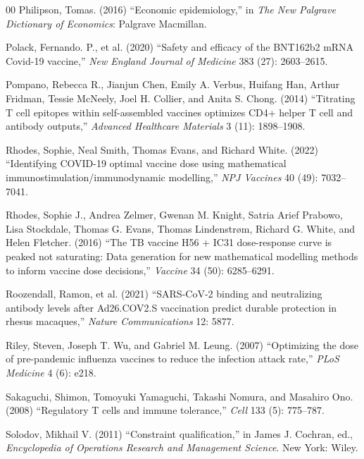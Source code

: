 \documentclass[12pt]{article}
\begin{document}
\begin{thebibliography}{00}
Philipson, Tomas. (2016) ``Economic epidemiology,'' in {\em The New
  Palgrave Dictionary of Economics}: Palgrave Macmillan.

Polack, Fernando. P., et al. (2020) ``Safety and efficacy of the
BNT162b2 mRNA Covid-19 vaccine,'' {\em New England Journal of
  Medicine} 383 (27): 2603--2615.

Pompano, Rebecca R., Jianjun Chen, Emily A. Verbus, Huifang Han,
Arthur Fridman, Tessie McNeely, Joel H. Collier, and Anita
S. Chong. (2014) ``Titrating T cell epitopes within self-assembled
vaccines optimizes CD4+ helper T cell and antibody outputs,'' {\em
  Advanced Healthcare Materials} 3 (11): 1898--1908.

Rhodes, Sophie, Neal Smith, Thomas Evans, and Richard White. (2022)
``Identifying COVID-19 optimal vaccine dose using mathematical
immunostimulation/immunodynamic modelling,'' {\em NPJ Vaccines} 40 (49):
7032--7041.

Rhodes, Sophie J., Andrea Zelmer, Gwenan M. Knight, Satria Arief
Prabowo, Lisa Stockdale, Thomas G. Evans, Thomas Lindenstr\o{}m,
Richard G. White, and Helen Fletcher. (2016) ``The TB vaccine H56 +
IC31 dose-response curve is peaked not saturating: Data generation for
new mathematical modelling methods to inform vaccine dose decisions,''
{\em Vaccine} 34 (50): 6285--6291.

Roozendall, Ramon, et al. (2021) ``SARS-CoV-2 binding and neutralizing
antibody levels after Ad26.COV2.S vaccination predict durable
protection in rhesus macaques,'' {\em Nature Communications} 12: 5877.

Riley, Steven, Joseph T. Wu, and Gabriel M. Leung. (2007) ``Optimizing
the dose of pre-pandemic influenza vaccines to reduce the infection
attack rate,'' {\em PLoS Medicine} 4 (6): e218.

Sakaguchi, Shimon, Tomoyuki Yamaguchi, Takashi Nomura, and Masahiro
Ono. (2008) ``Regulatory T cells and immune tolerance,'' {\em Cell}
133 (5): 775--787.

Solodov, Mikhail V. (2011) ``Constraint qualification,'' in James
J. Cochran, ed., {\em Encyclopedia of Operations Research and
  Management Science}. New York: Wiley.


\end{thebibliography}
\end{document}
